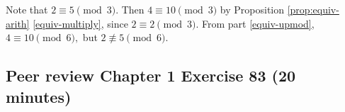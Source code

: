 \documentclass{../ximera}
\begin{document}
\begin{example}
Note that $2\equiv 5 \pmod 3$. Then $4\equiv 10 \pmod 3$ by Proposition \autoref{prop:equiv-arith} \ref{equiv-multiply}, since $2\equiv 2\pmod 3.$ From part \ref{equiv-upmod}, $4\equiv 10 \pmod 6,$ but $2\not\equiv 5\pmod 6.$ 
\end{example}


\subsection{Peer review Chapter 1 Exercise 83 (20 minutes)}

\end{document}
